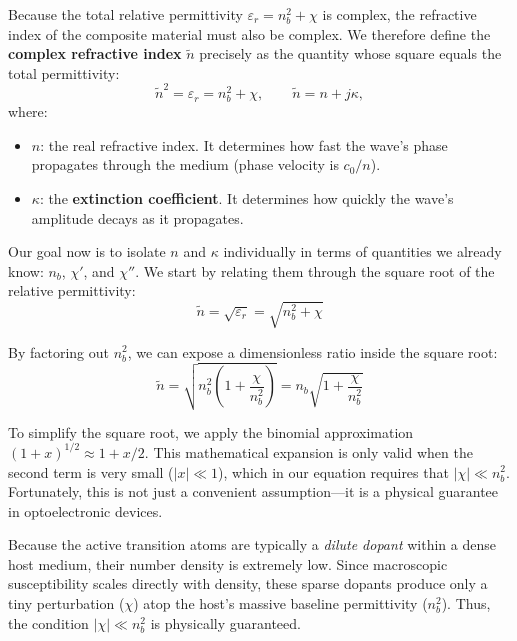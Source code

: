Because the total relative permittivity $\varepsilon_r = n_b^2 + \chi$ is complex, the refractive index of the composite material must also be complex. We therefore define the \textbf{complex refractive index} $\tilde{n}$ precisely as the quantity whose square equals the total permittivity:
\begin{equation*}
    \tilde{n}^2 = \varepsilon_r = n_b^2 + \chi, \qquad \tilde{n} = n + j\kappa,
\end{equation*}
where:
\begin{itemize}
    \item $n$: the real refractive index. It determines how fast the wave's phase propagates through the medium (phase velocity is $c_0/n$).
    \item $\kappa$: the \textbf{extinction coefficient}. It determines how quickly the wave's amplitude decays as it propagates.
\end{itemize}

Our goal now is to isolate $n$ and $\kappa$ individually in terms of quantities we already know: $n_b$, $\chi'$, and $\chi''$. We start by relating them through the square root of the relative permittivity:
\begin{equation*}
    \tilde{n} = \sqrt{\varepsilon_r} = \sqrt{n_b^2 + \chi}
\end{equation*}

By factoring out $n_b^2$, we can expose a dimensionless ratio inside the square root:
\begin{equation*}
    \tilde{n} = \sqrt{n_b^2\!\left(1 + \frac{\chi}{n_b^2}\right)} = n_b\sqrt{1 + \frac{\chi}{n_b^2}}
\end{equation*}

To simplify the square root, we apply the binomial approximation $(1+x)^{1/2} \approx 1 + x/2$. This mathematical expansion is only valid when the second term is very small ($|x| \ll 1$), which in our equation requires that $|\chi| \ll n_b^2$. Fortunately, this is not just a convenient assumption—it is a physical guarantee in optoelectronic devices.

\begin{keyinsight}
    Because the active transition atoms are typically a \textit{dilute dopant} within a dense host medium, their number density is extremely low. Since macroscopic susceptibility scales directly with density, these sparse dopants produce only a tiny perturbation ($\chi$) atop the host's massive baseline permittivity ($n_b^2$). Thus, the condition $|\chi| \ll n_b^2$ is physically guaranteed.
\end{keyinsight}

